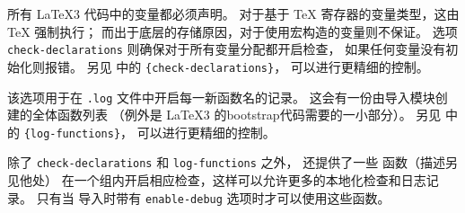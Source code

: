 \documentclass[full]{l3doc}
\begin{document}
%
所有 \LaTeX3 代码中的变量都必须声明。
对于基于 \TeX{} 寄存器的变量类型，这由 \TeX{} 强制执行；
而出于底层的存储原因，对于使用宏构造的变量则不保证。
选项 \texttt{check-declarations} 则确保对于所有变量分配都开启检查，
如果任何变量没有初始化则报错。
另见  中的  \texttt{\{check-declarations\}}，
可以进行更精细的控制。

%
该选项用于在 \texttt{.log} 文件中开启每一新函数名的记录。
这会有一份由导入模块创建的全体函数列表
（例外是 \LaTeX3 的bootstrap代码需要的一小部分）。
另见  中的 \texttt{\{log-functions\}}，
可以进行更精细的控制。

%
除了 \texttt{check-declarations} 和 \texttt{log-functions} 之外，
 还提供了一些  函数（描述另见他处）
在一个组内开启相应检查，这样可以允许更多的本地化检查和日志记录。
只有当  导入时带有 \texttt{enable-debug} 选项时才可以使用这些函数。
\end{document}
